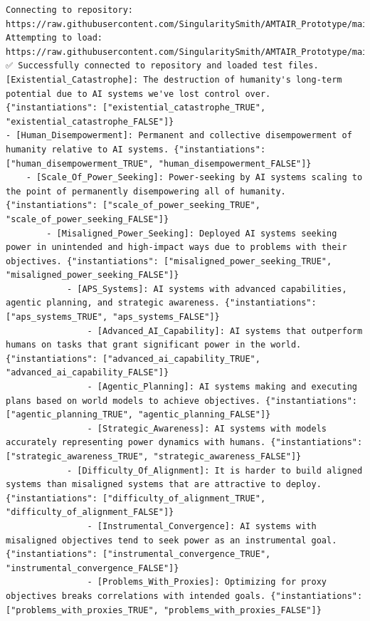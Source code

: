 \documentclass[
  11pt,
  letterpaper,
]{book}
\begin{document}
\label{my_code_cell_test}
\begin{verbatim}
Connecting to repository: https://raw.githubusercontent.com/SingularitySmith/AMTAIR_Prototype/main/data/example_carlsmith/
Attempting to load: https://raw.githubusercontent.com/SingularitySmith/AMTAIR_Prototype/main/data/example_carlsmith/ArgDown.md
✅ Successfully connected to repository and loaded test files.
[Existential_Catastrophe]: The destruction of humanity's long-term potential due to AI systems we've lost control over. {"instantiations": ["existential_catastrophe_TRUE", "existential_catastrophe_FALSE"]}
- [Human_Disempowerment]: Permanent and collective disempowerment of humanity relative to AI systems. {"instantiations": ["human_disempowerment_TRUE", "human_disempowerment_FALSE"]}
    - [Scale_Of_Power_Seeking]: Power-seeking by AI systems scaling to the point of permanently disempowering all of humanity. {"instantiations": ["scale_of_power_seeking_TRUE", "scale_of_power_seeking_FALSE"]}
        - [Misaligned_Power_Seeking]: Deployed AI systems seeking power in unintended and high-impact ways due to problems with their objectives. {"instantiations": ["misaligned_power_seeking_TRUE", "misaligned_power_seeking_FALSE"]}
            - [APS_Systems]: AI systems with advanced capabilities, agentic planning, and strategic awareness. {"instantiations": ["aps_systems_TRUE", "aps_systems_FALSE"]}
                - [Advanced_AI_Capability]: AI systems that outperform humans on tasks that grant significant power in the world. {"instantiations": ["advanced_ai_capability_TRUE", "advanced_ai_capability_FALSE"]}
                - [Agentic_Planning]: AI systems making and executing plans based on world models to achieve objectives. {"instantiations": ["agentic_planning_TRUE", "agentic_planning_FALSE"]}
                - [Strategic_Awareness]: AI systems with models accurately representing power dynamics with humans. {"instantiations": ["strategic_awareness_TRUE", "strategic_awareness_FALSE"]}
            - [Difficulty_Of_Alignment]: It is harder to build aligned systems than misaligned systems that are attractive to deploy. {"instantiations": ["difficulty_of_alignment_TRUE", "difficulty_of_alignment_FALSE"]}
                - [Instrumental_Convergence]: AI systems with misaligned objectives tend to seek power as an instrumental goal. {"instantiations": ["instrumental_convergence_TRUE", "instrumental_convergence_FALSE"]}
                - [Problems_With_Proxies]: Optimizing for proxy objectives breaks correlations with intended goals. {"instantiations": ["problems_with_proxies_TRUE", "problems_with_proxies_FALSE"]}

\end{verbatim}
\end{document}
